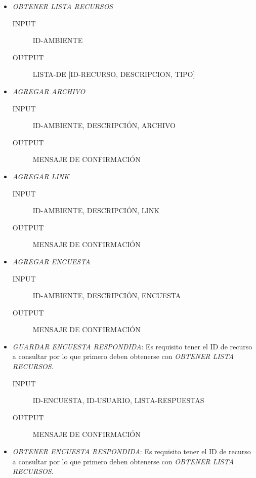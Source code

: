 \documentclass{article}
\begin{document}
\begin{description}
\begin{itemize}
\begin{itemize}
				
				
			\end{itemize}
			\clearpage
			\item \emph{OBTENER LISTA RECURSOS}
			\begin{description}
				\item[INPUT] ID-AMBIENTE
				\item[OUTPUT] LISTA-DE [ID-RECURSO, DESCRIPCION, TIPO]\\
			\end{description}
			
			
			\item \emph{AGREGAR ARCHIVO}
			\begin{description}
				\item[INPUT] ID-AMBIENTE, DESCRIPCI\'ON, ARCHIVO
				\item[OUTPUT] MENSAJE DE CONFIRMACI\'ON\\
			\end{description}
			\item \emph{AGREGAR LINK}
			\begin{description}
				\item[INPUT] ID-AMBIENTE, DESCRIPCI\'ON, LINK
				\item[OUTPUT] MENSAJE DE CONFIRMACI\'ON \\
			\end{description}
			\item \emph{AGREGAR ENCUESTA}
			\begin{description}
				\item[INPUT] ID-AMBIENTE, DESCRIPCI\'ON, ENCUESTA 
				\item[OUTPUT] MENSAJE DE CONFIRMACI\'ON\\
			\end{description}
			\item \emph{GUARDAR ENCUESTA RESPONDIDA}:  Es requisito tener el ID de recurso a consultar por lo que primero deben obtenerse con \emph{OBTENER LISTA RECURSOS}.
			\begin{description}
				\item[INPUT] ID-ENCUESTA, ID-USUARIO, LISTA-RESPUESTAS
				\item[OUTPUT] MENSAJE DE CONFIRMACI\'ON \\
			\end{description}
			\item \emph{OBTENER ENCUESTA RESPONDIDA}:  Es requisito tener el ID de recurso a consultar por lo que primero deben obtenerse con \emph{OBTENER LISTA RECURSOS}.

\end{itemize}
\end{description}
\end{document}
